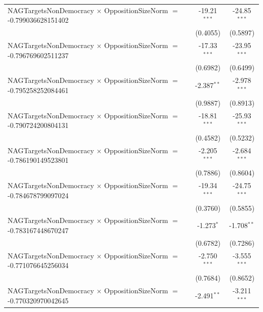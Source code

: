 \begin{tabular}{lcc}
   NAGTargetsNonDemocracy $\times$ OppositionSizeNorm $=$ -0.799036628151402    & -19.21$^{***}$       & -24.85$^{***}$\\   
                                                                                & (0.4055)             & (0.5897)\\   
   NAGTargetsNonDemocracy $\times$ OppositionSizeNorm $=$ -0.796769602511237    & -17.33$^{***}$       & -23.95$^{***}$\\   
                                                                                & (0.6982)             & (0.6499)\\   
   NAGTargetsNonDemocracy $\times$ OppositionSizeNorm $=$ -0.795258252084461    & -2.387$^{**}$        & -2.978$^{***}$\\   
                                                                                & (0.9887)             & (0.8913)\\   
   NAGTargetsNonDemocracy $\times$ OppositionSizeNorm $=$ -0.790724200804131    & -18.81$^{***}$       & -25.93$^{***}$\\   
                                                                                & (0.4582)             & (0.5232)\\   
   NAGTargetsNonDemocracy $\times$ OppositionSizeNorm $=$ -0.786190149523801    & -2.205$^{***}$       & -2.684$^{***}$\\   
                                                                                & (0.7886)             & (0.8604)\\   
   NAGTargetsNonDemocracy $\times$ OppositionSizeNorm $=$ -0.784678799097024    & -19.34$^{***}$       & -24.75$^{***}$\\   
                                                                                & (0.3760)             & (0.5855)\\   
   NAGTargetsNonDemocracy $\times$ OppositionSizeNorm $=$ -0.783167448670247    & -1.273$^{*}$         & -1.708$^{**}$\\   
                                                                                & (0.6782)             & (0.7286)\\   
   NAGTargetsNonDemocracy $\times$ OppositionSizeNorm $=$ -0.771076645256034    & -2.750$^{***}$       & -3.555$^{***}$\\   
                                                                                & (0.7684)             & (0.8652)\\   
   NAGTargetsNonDemocracy $\times$ OppositionSizeNorm $=$ -0.770320970042645    & -2.491$^{**}$        & -3.211$^{***}$\\   

\end{tabular}
